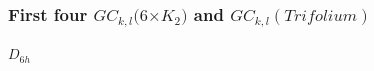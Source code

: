 \documentclass{beamer}
\begin{document}
\begin{frame}\frametitle{First four $GC_{k,l}(6$$\times$$ K_2)$ and $GC_{k,l}(Trifolium)$} 




\begin{center}
\begin{minipage}[b]{25mm}
\centering
{}\par
$D_{6h}$ 
\end{minipage}
\begin{minipage}[b]{23mm}
\centering
{}\par

\end{minipage}
\end{center}
\end{frame}
\end{document}
